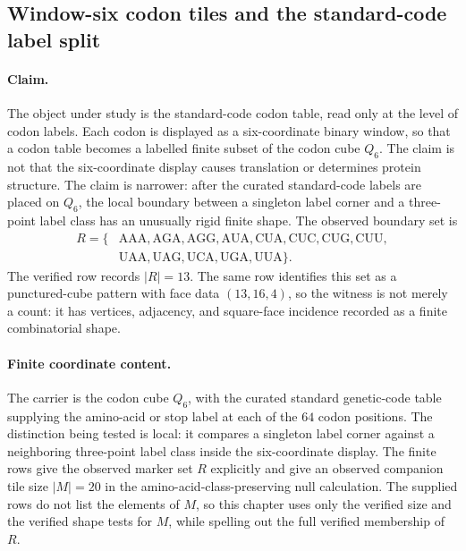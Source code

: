 \subsection{Window-six codon tiles and the standard-code label split}\label{sec:bioreality-h0-m-shape-significance}

\paragraph{Claim.}
The object under study is the standard-code codon table, read only at the level of codon labels.  Each codon is displayed as a six-coordinate binary window, so that a codon table becomes a labelled finite subset of the codon cube $Q_6$.  The claim is not that the six-coordinate display causes translation or determines protein structure.  The claim is narrower: after the curated standard-code labels are placed on $Q_6$, the local boundary between a singleton label corner and a three-point label class has an unusually rigid finite shape.  The observed boundary set is
$$
\begin{aligned}
R=\{&\mathrm{AAA},\mathrm{AGA},\mathrm{AGG},\mathrm{AUA},\mathrm{CUA},\mathrm{CUC},\mathrm{CUG},\mathrm{CUU},\\
&\mathrm{UAA},\mathrm{UAG},\mathrm{UCA},\mathrm{UGA},\mathrm{UUA}\}.
\end{aligned}
$$
The verified row records $|R|=13$.  The same row identifies this set as a punctured-cube pattern with face data $(13,16,4)$, so the witness is not merely a count: it has vertices, adjacency, and square-face incidence recorded as a finite combinatorial shape.

\paragraph{Finite coordinate content.}
The carrier is the codon cube $Q_6$, with the curated standard genetic-code table supplying the amino-acid or stop label at each of the $64$ codon positions.  The distinction being tested is local: it compares a singleton label corner against a neighboring three-point label class inside the six-coordinate display.  The finite rows give the observed marker set $R$ explicitly and give an observed companion tile size $|M|=20$ in the amino-acid-class-preserving null calculation.  The supplied rows do not list the elements of $M$, so this chapter uses only the verified size and the verified shape tests for $M$, while spelling out the full verified membership of $R$.

